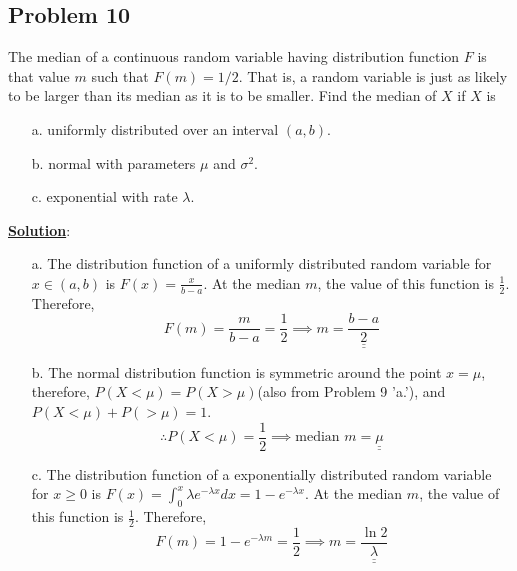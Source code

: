 \documentclass[11pt,letter paper]{report}
\begin{document}
\subsection*{Problem 10}
The median of a continuous random variable having distribution function $F$ is that value $m$ such that $F(m)=1/2$. That is, a random variable is just as likely to be larger than its median as it is to be smaller. Find the median of $X$ if $X$ is
\begin{itemize}
\item[a.] uniformly distributed over an interval $(a,b)$.
\item[b.] normal with parameters $\mu$ and $\sigma^2$.
\item[c.] exponential with rate $\lambda$.
\end{itemize}
{\bf \underline{Solution}}:
\begin{itemize}
\item[a.] The distribution function of a uniformly distributed random variable for $x\in (a,b)$ is $F(x)=\frac{x}{b-a}$. At the median $m$, the value of this function is $\frac{1}{2}$. Therefore, 
$$F(m)=\frac{m}{b-a}=\frac{1}{2}\implies m=\underline{\underline{\frac{b-a}{2}}}$$
\item[b.] The normal distribution function is symmetric around the point $x=\mu$, therefore, $P(X<\mu)=P(X>\mu)$(also from Problem 9 'a.'), and $P(X<\mu)+P(>\mu)=1$. 
$$\therefore P(X<\mu)=\frac{1}{2}\implies \text{median }m=\underline{\underline{\mu}}$$  
\item[c.] The distribution function of a exponentially distributed random variable for $x\ge 0$ is $F(x)=\int_0^x\lambda e^{-\lambda x}dx=1-e^{-\lambda x}$. At the median $m$, the value of this function is $\frac{1}{2}$. Therefore, 
$$F(m)=1-e^{-\lambda m}=\frac{1}{2}\implies m=\underline{\underline{\frac{\ln{2}}{\lambda}}}$$
\end{itemize}
\end{document}
